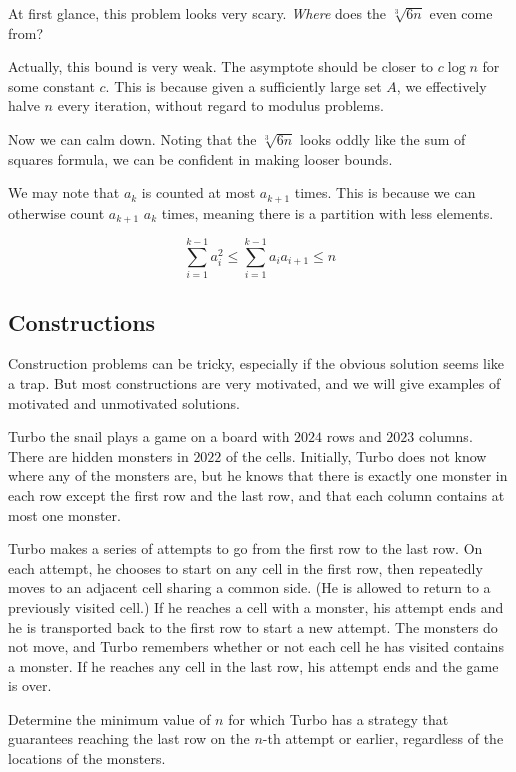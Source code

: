 \documentclass[11pt]{scrartcl}
\theoremstyle{plain} %
\theoremstyle{definition}
\theoremstyle{remark}
\theoremstyle{empty}
\theoremstyle{empty}
\theoremstyle{empty}
\theoremstyle{empty}
\theoremstyle{empty}
\theoremstyle{empty}
\begin{document}
\begin{solution}
At first glance, this problem looks very scary. \textit{Where} does the $\sqrt[3]{6n}$ even come from? 

Actually, this bound is very weak. The asymptote should be closer to $c\log n$ for some constant $c$. This is because given a sufficiently large set $A$, we effectively halve $n$ every iteration, without regard to modulus problems. 

Now we can calm down. Noting that the $\sqrt[3]{6n}$ looks oddly like the sum of squares formula, we can be confident in making looser bounds.

We may note that $a_k$ is counted at most $a_{k+1}$ times. This is because we can otherwise count $a_{k+1}$ $a_k$ times, meaning there is a partition with less elements. 

\[\sum_{i=1}^{k-1} a_i^2 \le \sum_{i=1}^{k-1}a_ia_{i+1} \le n\]
\end{solution}

\subsection{Constructions}

Construction problems can be tricky, especially if the obvious solution seems like a trap. But most constructions are very motivated, and we will give examples of motivated and unmotivated solutions.

\begin{problem}[2024 ISL C4]
Turbo the snail plays a game on a board with $2024$ rows and $2023$ columns. There are hidden monsters in $2022$ of the cells. Initially, Turbo does not know where any of the monsters are, but he knows that there is exactly one monster in each row except the first row and the last row, and that each column contains at most one monster.

Turbo makes a series of attempts to go from the first row to the last row. On each attempt, he chooses to start on any cell in the first row, then repeatedly moves to an adjacent cell sharing a common side. (He is allowed to return to a previously visited cell.) If he reaches a cell with a monster, his attempt ends and he is transported back to the first row to start a new attempt. The monsters do not move, and Turbo remembers whether or not each cell he has visited contains a monster. If he reaches any cell in the last row, his attempt ends and the game is over.

Determine the minimum value of $n$ for which Turbo has a strategy that guarantees reaching the last row on the $n$-th attempt or earlier, regardless of the locations of the monsters.
\end{problem}
\end{document}
